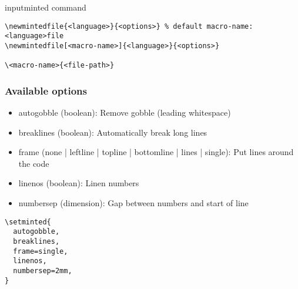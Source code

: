 \documentclass[../../latex]{subfiles}
\begin{document}
inputminted command

\begin{verbatim}
\newmintedfile{<language>}{<options>} % default macro-name: <language>file
\newmintedfile[<macro-name>]{<language>}{<options>}

\<macro-name>{<file-path>}
\end{verbatim}

\subsubsection{Available options}

\begin{itemize}
  \item autogobble (boolean): Remove gobble (leading whitespace)
  \item breaklines (boolean): Automatically break long lines
  \item frame (none | leftline | topline | bottomline | lines | single): Put lines around the code
  \item linenos (boolean): Linen numbers
  \item numbersep (dimension): Gap between numbers and start of line
\end{itemize}

\begin{verbatim}
\setminted{
  autogobble,
  breaklines,
  frame=single,
  linenos,
  numbersep=2mm,
}
\end{verbatim}
\end{document}
